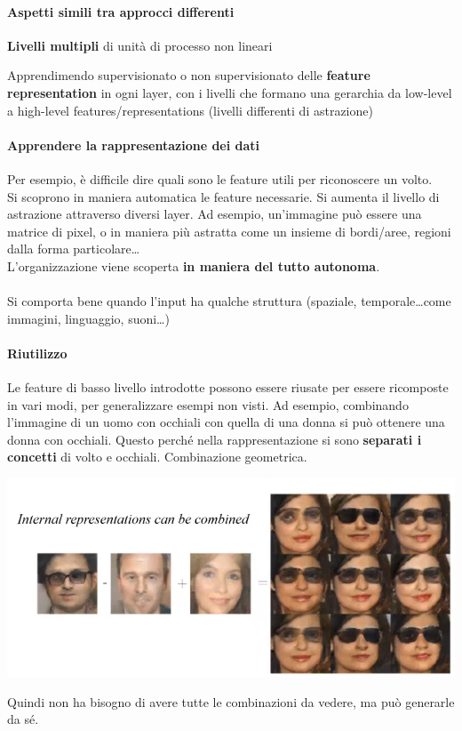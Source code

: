\documentclass[10pt]{book}
\begin{document}
\paragraph{Aspetti simili tra approcci differenti}
\begin{list}{}{}
	\item \textbf{Livelli multipli} di unità di processo non lineari
	\item Apprendimendo supervisionato o non supervisionato delle \textbf{feature representation} in ogni layer, con i livelli che formano una gerarchia da low-level a high-level features/representations (livelli differenti di astrazione)
\end{list}
\paragraph{Apprendere la rappresentazione dei dati} Per esempio, è difficile dire quali sono le feature utili per riconoscere un volto.\\
Si scoprono in maniera automatica le feature necessarie. Si aumenta il livello di astrazione attraverso diversi layer. Ad esempio, un'immagine può essere una matrice di pixel, o in maniera più astratta come un insieme di bordi/aree, regioni dalla forma particolare\ldots\\
L'organizzazione viene scoperta \textbf{in maniera del tutto autonoma}.\\\\
Si comporta bene quando l'input ha qualche struttura (spaziale, temporale\ldots come immagini, linguaggio, suoni\ldots)
\paragraph{Riutilizzo} Le feature di basso livello introdotte possono essere riusate per essere ricomposte in vari modi, per generalizzare esempi non visti. Ad esempio, combinando l'immagine di un uomo con occhiali con quella di una donna si può ottenere una donna con occhiali. Questo perché nella rappresentazione si sono \textbf{separati i concetti} di volto e occhiali. Combinazione geometrica.
\begin{center}
	\includegraphics[scale=0.75]{dl2.png}
\end{center}
Quindi non ha bisogno di avere tutte le combinazioni da vedere, ma può generarle da sé.
\end{document}
